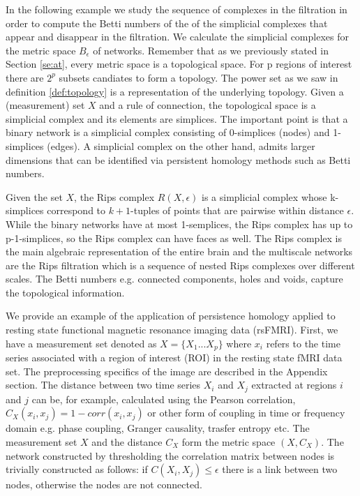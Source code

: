 \documentclass[onecollarge,runningheads]{svjour2}
\begin{document}
In the following example we study the sequence of complexes in the filtration in order to compute the Betti numbers of the of the simplicial complexes that appear and disappear in the filtration.
We calculate the simplicial complexes for the metric space $B_\epsilon$ of networks. Remember that as
we previously stated in Section \ref{se:at}, every metric space is a topological space.
For p regions of interest there are $2^p$ subsets candiates to form a topology. The power set as we saw in definition \ref{def:topology} is a representation of the underlying topology.
Given a (measurement) set $X$ and a rule of connection, the topological space is a simplicial complex and its elements are simplices. The important point is that a binary network is a simplicial complex consisting of 0-simplices (nodes) and 1-simplices (edges). A simplicial complex on the other hand, admits larger dimensions that can be identified via persistent homology methods such as Betti numbers. 

Given the set $X$, the Rips complex $R(X,\epsilon)$ is a simplicial complex whose k-simplices correspond to $k+1$-tuples of points that are pairwise within distance $\epsilon$.
While the binary networks have at most 1-semplices, the Rips complex has up to p-1-simplices, so the Rips complex can have faces as well. The Rips complex is the main algebraic representation of the entire brain and the multiscale networks are the Rips filtration which is a sequence of nested Rips complexes over different scales. The Betti numbers e.g. connected components, holes and voids, capture the topological information.

We provide an example of the application of persistence homology applied to resting state functional magnetic resonance imaging data (rsFMRI). First, we have a measurement set denoted as $X= \{X_1 ... X_p\}$ where $x_i$ refers to the time series associated with a region of interest (ROI) in the resting state fMRI data set. The preprocessing specifics of the image are described in the Appendix section. 
The distance between two time series $X_i$ and $X_j$ extracted at regions $i$ and $j$ can be, for example, calculated using the Pearson correlation, $C_{X}(x_i ,x_j)= 1 - corr(x_i,x_j)$ or other form of coupling in time or frequency domain e.g. phase coupling, Granger causality, trasfer entropy etc.
The measurement set $X$ and the distance $C_X$ form the metric space $(X,C_X)$. The network constructed by thresholding the correlation matrix between nodes is trivially constructed as follows: if $C(X_i,X_j) \leq \epsilon$ there is a link between two nodes, otherwise the nodes are not connected.
\end{document}
